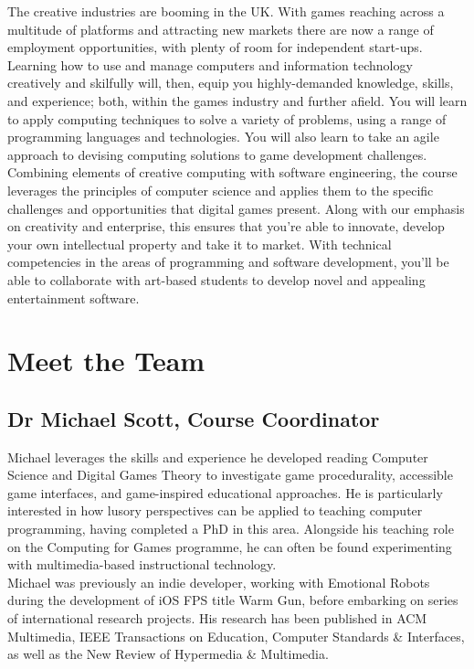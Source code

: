 \documentclass[10pt, a5paper, twoside, openright, titlepage]{memoir}\usepackage{etoolbox}\newtoggle{printable}\toggletrue{printable}\newtoggle{isBeamer}\togglefalse{isBeamer}
\begin{document}
The creative industries are booming in the UK. With games reaching across a multitude of platforms and attracting new markets there are now a range of employment opportunities, with plenty of room for independent start-ups. Learning how to use and manage computers and information technology creatively and skilfully will, then, equip you highly-demanded knowledge, skills, and experience; both, within the games industry and further afield. You will learn to apply computing techniques to solve a variety of problems, using a range of programming languages and technologies. You will also learn to take an agile approach to devising computing solutions to game development challenges. Combining elements of creative computing with software engineering, the course leverages the principles of computer science and applies them to the specific challenges and opportunities that digital games present. Along with our emphasis on creativity and enterprise, this ensures that you're able to innovate, develop your own intellectual property and take it to market. With technical competencies in the areas of programming and software development, you'll be able to collaborate with art-based students to develop novel and appealing entertainment software. \\

\section{Meet the Team}

\subsection{Dr Michael Scott, Course Coordinator}

Michael leverages the skills and experience he developed reading Computer Science and Digital Games Theory to investigate game procedurality, accessible game interfaces, and game-inspired educational approaches. He is particularly interested in how lusory perspectives can be applied to teaching computer programming, having completed a PhD in this area. Alongside his teaching role on the Computing for Games programme, he can often be found experimenting with multimedia-based instructional technology.\\

Michael was previously an indie developer, working with Emotional Robots during the development of iOS FPS title Warm Gun, before embarking on series of international research projects. His research has been published in ACM Multimedia, IEEE Transactions on Education, Computer Standards \& Interfaces, as well as the New Review of Hypermedia \& Multimedia.\\
\end{document}
